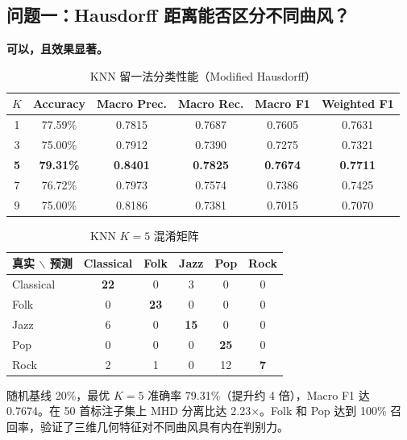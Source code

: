 \documentclass[withoutpreface]{cumcmthesis}
\begin{document}
\subsection{问题一：Hausdorff 距离能否区分不同曲风？}

\textbf{可以，且效果显著。}

\begin{table}[htbp]
    \centering
    \caption{KNN 留一法分类性能（Modified Hausdorff）}
    \label{tab:knn}
    \begin{tabular}{cccccc}
        \toprule
        \textbf{$K$} & \textbf{Accuracy} & \textbf{Macro Prec.} & \textbf{Macro Rec.} & \textbf{Macro F1} & \textbf{Weighted F1} \\
        \midrule
        1 & 77.59\% & 0.7815 & 0.7687 & 0.7605 & 0.7631 \\
        3 & 75.00\% & 0.7912 & 0.7390 & 0.7275 & 0.7321 \\
        \textbf{5} & \textbf{79.31\%} & \textbf{0.8401} & \textbf{0.7825} & \textbf{0.7674} & \textbf{0.7711} \\
        7 & 76.72\% & 0.7973 & 0.7574 & 0.7386 & 0.7425 \\
        9 & 75.00\% & 0.8186 & 0.7381 & 0.7015 & 0.7070 \\
        \bottomrule
    \end{tabular}
\end{table}

\begin{table}[htbp]
    \centering
    \caption{KNN $K=5$ 混淆矩阵}
    \label{tab:confusion}
    \begin{tabular}{lccccc}
        \toprule
        \textbf{真实 $\backslash$ 预测} & \textbf{Classical} & \textbf{Folk} & \textbf{Jazz} & \textbf{Pop} & \textbf{Rock} \\
        \midrule
        Classical & \textbf{22} & 0 & 3 & 0 & 0 \\
        Folk & 0 & \textbf{23} & 0 & 0 & 0 \\
        Jazz & 6 & 0 & \textbf{15} & 0 & 0 \\
        Pop & 0 & 0 & 0 & \textbf{25} & 0 \\
        Rock & 2 & 1 & 0 & 12 & \textbf{7} \\
        \bottomrule
    \end{tabular}
\end{table}

随机基线 20\%，最优 $K=5$ 准确率 79.31\%（提升约 4 倍），Macro F1 达 0.7674。在 50 首标注子集上 MHD 分离比达 2.23$\times$。Folk 和 Pop 达到 100\% 召回率，验证了三维几何特征对不同曲风具有内在判别力。
\end{document}
